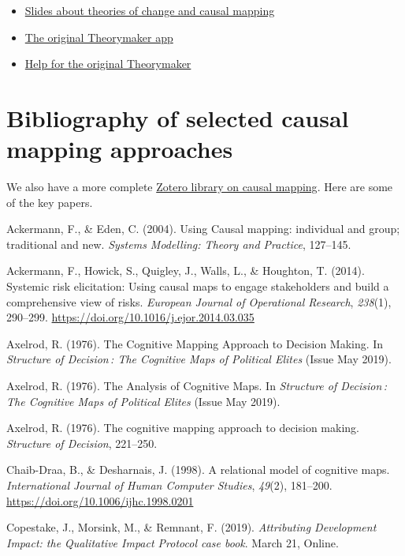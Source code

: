 \documentclass[
]{book}
\providecommand{\tightlist}{%
  \setlength{\itemsep}{0pt}\setlength{\parskip}{0pt}}
\begin{document}
\begin{itemize}
\tightlist
\item
  \href{http://slides.theorymaker.info/}{Slides about theories of change and causal mapping}
\item
  \href{http://www.pogol.net/_causal_mapping/theorymaker.info}{The original Theorymaker app}
\item
  \href{http://help.theorymaker.info/}{Help for the original Theorymaker}
\end{itemize}

\hypertarget{bibliography-of-selected-causal-mapping-approaches}{%
\section{Bibliography of selected causal mapping approaches}\label{bibliography-of-selected-causal-mapping-approaches}}

We also have a more complete \href{https://www.zotero.org/groups/2858107/causal-mapping/library}{Zotero library on causal mapping}. Here are some of the key papers.

Ackermann, F., \& Eden, C. (2004). Using Causal mapping: individual and group; traditional and new. \emph{Systems Modelling: Theory and Practice}, 127--145.

Ackermann, F., Howick, S., Quigley, J., Walls, L., \& Houghton, T. (2014). Systemic risk elicitation: Using causal maps to engage stakeholders and build a comprehensive view of risks. \emph{European Journal of Operational Research}, \emph{238}(1), 290--299. \url{https://doi.org/10.1016/j.ejor.2014.03.035}

Axelrod, R. (1976). The Cognitive Mapping Approach to Decision Making. In \emph{Structure of Decision\,: The Cognitive Maps of Political Elites} (Issue May 2019).

Axelrod, R. (1976). The Analysis of Cognitive Maps. In \emph{Structure of Decision\,: The Cognitive Maps of Political Elites} (Issue May 2019).

Axelrod, R. (1976). The cognitive mapping approach to decision making. \emph{Structure of Decision}, 221--250.

Chaib-Draa, B., \& Desharnais, J. (1998). A relational model of cognitive maps. \emph{International Journal of Human Computer Studies}, \emph{49}(2), 181--200. \url{https://doi.org/10.1006/ijhc.1998.0201}

Copestake, J., Morsink, M., \& Remnant, F. (2019). \emph{Attributing Development Impact: the Qualitative Impact Protocol case book}. March 21, Online.
\end{document}
